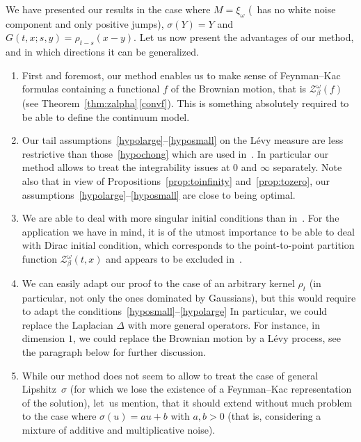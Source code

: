 \documentclass[10pt]{amsart}
\let\mathcal\mathscr
\newenvironment{enumeratea}
{\bgroup\def\theenumi{\alph{enumi}}\begin{enumerate}}
{\end{enumerate}\egroup}
\theoremstyle{definition}
\newcommand{\cZ}{{\ensuremath{\mathcal Z}} }
\let\gb\beta
\let\gD\Delta
\let\go\omega
\begin{document}
We have presented our results in the case where
$M=\xi_{\go}$ (\ie ~has no white noise component and only positive jumps), $\sigma(Y)=Y$ and $G(t,x ;s,y) =\rho_{t-s}(x-y)$.
Let us now present the advantages of our method, and in which directions it can be generalized.
\begin{enumeratea}
\item
First and foremost, our method enables us to make sense of Feynman--Kac formulas containing a functional $f$ of the Brownian motion, that is $\cZ^\go_{\beta}(f)$ (see Theorem~\ref{thm:zalpha}\,\eqref{convf}). This is something absolutely required to be able to define the continuum model.

\item
Our tail assumptions~\eqref{hypolarge}--\eqref{hyposmall} on the Lévy measure are less restrictive
than those~\eqref{hypochong} which are used in~\cite{Chong17}. In particular our method allows to treat the integrability issues at $0$ and $\infty$ separately.
Note also that in view of Propositions~\ref{prop:toinfinity} and~\ref{prop:tozero}, our assumptions~\eqref{hypolarge}--\eqref{hyposmall} are close to being optimal.

\item
We are able to deal with more singular initial conditions
than in~\cite{Chong17}. For the application we have in mind, it is of the utmost importance to be able to deal with Dirac initial condition, which corresponds to the point-to-point partition function $\cZ_{\gb}^{\go}(t,x)$ and appears to be excluded in~\cite{Chong17}.

\item
We can easily adapt our proof to the case
of an arbitrary kernel $\rho_t$ (in particular, not only the ones dominated by Gaussians), but this would require to adapt
the conditions~\eqref{hyposmall}--\eqref{hypolarge}
In particular, we could replace the Laplacian $\gD$ with more general operators. For instance, in dimension $1$, we could replace the Brownian motion by a Lévy process,
see the paragraph below for further discussion.

\item
While our method does not seem to allow to treat the case of general Lipshitz~$\sigma$ (for which we lose the existence of a Feynman--Kac representation of the solution), let~us mention, that it should extend without much problem to the case where \hbox{$\sigma(u)=au+b$} with $a,b>0$ (that is, considering a mixture of additive and multiplicative noise).


\end{enumeratea}
\end{document}
